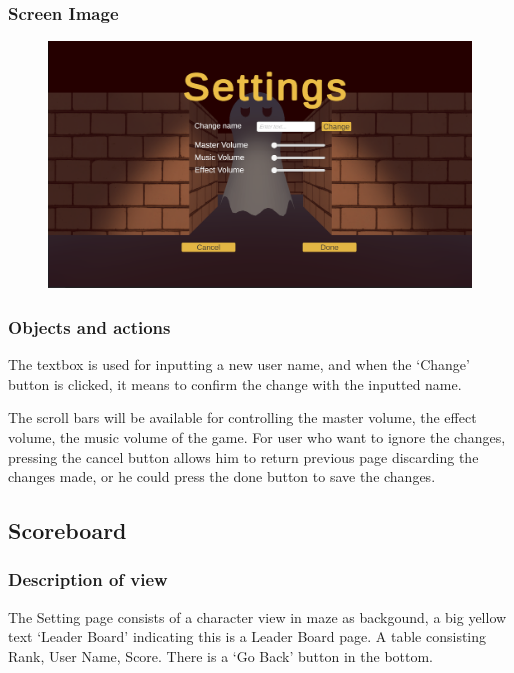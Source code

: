 \documentclass[11pt]{article}
\begin{document}
\subsubsection{Screen Image}
\begin{figure}[H]
    \centering
    \includegraphics*[scale=0.2]{UI1.2Settings.png}
\end{figure}
\subsubsection{Objects and actions}
The textbox is used for inputting a new user name, and when the `Change' button is clicked, it means to confirm the change with the inputted name.

The scroll bars will be available for controlling the master volume, the effect volume, the music volume of the game. For user who want to ignore the changes, pressing the cancel button allows him to return previous page discarding the changes made, or he could press the done button to save the changes.

\subsection{Scoreboard}
\subsubsection{Description of view}
The Setting page consists of a character view in maze as backgound, a big yellow text `Leader Board' indicating this is a Leader Board page. A table consisting Rank, User Name, Score. There is a `Go Back' button in the bottom.
\end{document}
